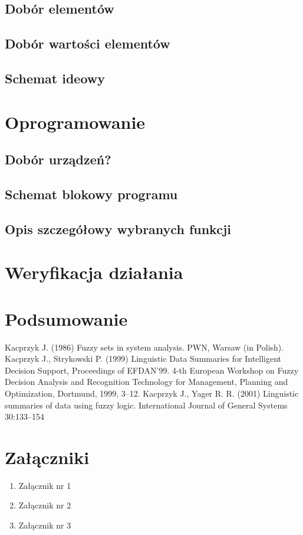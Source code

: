 \documentclass[12pt,a4paper]{report}
\begin{document}
\section{Dobór elementów}
\section{Dobór wartości elementów}
\section{Schemat ideowy}

\chapter{Oprogramowanie}

\section{Dobór urządzeń?}
\section{Schemat blokowy programu}
\section{Opis szczegółowy wybranych funkcji}
\chapter{Weryfikacja działania}
\chapter{Podsumowanie}
\begin{thebibliography}{99}
Kacprzyk J. (1986) Fuzzy sets in system analysis.  PWN, Warsaw (in Polish).
Kacprzyk J., Strykowski P. (1999) Linguistic Data Summaries for Intelligent Decision Support, Proceedings of EFDAN'99. 4-th European Workshop on Fuzzy Decision Analysis and Recognition Technology for Management, Planning and Optimization, Dortmund, 1999, 3--12.
Kacprzyk J., Yager R. R. (2001) Linguistic summaries of data using fuzzy logic. International Journal of General Systems 30:133--154 

\end{thebibliography}

\listoffigures

\listoftables


\chapter*{Załączniki}
\begin{enumerate}
\item Załącznik nr 1
\item Załącznik nr 2
\item Załącznik nr 3
\end{enumerate}
\end{document}
